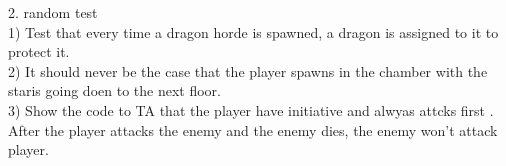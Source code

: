\documentclass{article}
\begin{document}
2. random test\\
1) Test that every time a dragon horde is spawned, a dragon is assigned to it to protect it.\\
2) It should never be the case that the player spawns in the chamber with the staris going doen to the next floor.\\
3) Show the code to TA that the player have initiative and alwyas attcks first . After the player attacks the enemy and the enemy dies, the enemy won't attack player.
\end{document}
